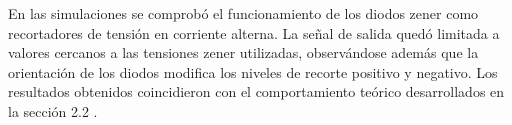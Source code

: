 \begin{figure}[H]
\centering
{}
\caption{}
\end{figure}

En las simulaciones se comprobó el funcionamiento de los diodos zener como recortadores
de tensión en corriente alterna. La señal de salida quedó limitada a valores cercanos a las
tensiones zener utilizadas, observándose además que la orientación de los diodos modifica
los niveles de recorte positivo y negativo. Los resultados obtenidos coincidieron con el
comportamiento teórico  desarrollados en la sección 2.2 .